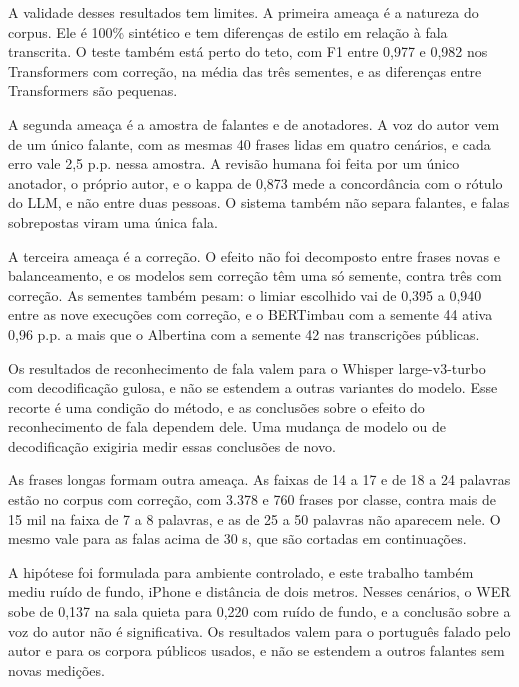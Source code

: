 \documentclass[
    12pt,                %
    openright,           %
    oneside,             %
    a4paper,             %
    english,             %
    brazil               %
]{abntex2}
\begin{document}
A validade desses resultados tem limites. A primeira ameaça é a natureza do corpus. Ele é 100\% sintético e tem diferenças de estilo em relação à fala transcrita. O teste também está perto do teto, com F1 entre 0,977 e 0,982 nos Transformers com correção, na média das três sementes, e as diferenças entre Transformers são pequenas. 

A segunda ameaça é a amostra de falantes e de anotadores. A voz do autor vem de um único falante, com as mesmas 40 frases lidas em quatro cenários, e cada erro vale 2,5 p.p. nessa amostra. A revisão humana foi feita por um único anotador, o próprio autor, e o kappa de 0,873 mede a concordância com o rótulo do LLM, e não entre duas pessoas. O sistema também não separa falantes, e falas sobrepostas viram uma única fala.

A terceira ameaça é a correção. O efeito não foi decomposto entre frases novas e balanceamento, e os modelos sem correção têm uma só semente, contra três com correção. As sementes também pesam: o limiar escolhido vai de 0,395 a 0,940 entre as nove execuções com correção, e o BERTimbau com a semente 44 ativa 0,96 p.p. a mais que o Albertina com a semente 42 nas transcrições públicas.

Os resultados de reconhecimento de fala valem para o Whisper large-v3-turbo com decodificação gulosa, e não se estendem a outras variantes do modelo. Esse recorte é uma condição do método, e as conclusões sobre o efeito do reconhecimento de fala dependem dele. Uma mudança de modelo ou de decodificação exigiria medir essas conclusões de novo.

As frases longas formam outra ameaça. As faixas de 14 a 17 e de 18 a 24 palavras estão no corpus com correção, com 3.378 e 760 frases por classe, contra mais de 15 mil na faixa de 7 a 8 palavras, e as de 25 a 50 palavras não aparecem nele. O mesmo vale para as falas acima de 30 s, que são cortadas em continuações.

A hipótese foi formulada para ambiente controlado, e este trabalho também mediu ruído de fundo, iPhone e distância de dois metros. Nesses cenários, o WER sobe de 0,137 na sala quieta para 0,220 com ruído de fundo, e a conclusão sobre a voz do autor não é significativa. Os resultados valem para o português falado pelo autor e para os corpora públicos usados, e não se estendem a outros falantes sem novas medições.


\end{document}

